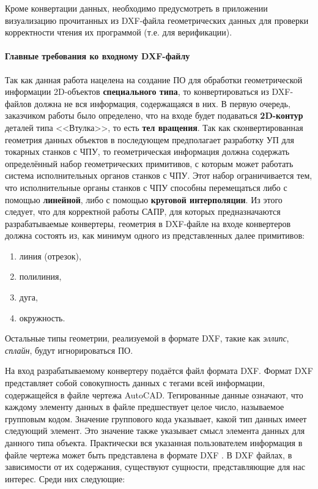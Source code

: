 Кроме конвертации данных, необходимо предусмотреть в приложении визуализацию прочитанных из DXF-файла геометрических данных для проверки корректности чтения их программой (т.е. для верификации).

\paragraph{Главные требования ко входному DXF-файлу}

Так как данная работа нацелена на создание ПО для обработки геометрической информации 2D-объектов \textbf{специального типа}, то конвертироваться из DXF-файлов должна не вся информация, содержащаяся в них. В первую очередь, заказчиком работы было определено, что на входе будет подаваться \textbf{2D-контур} деталей типа <<Втулка>>, то есть \textbf{тел вращения}. Так как сконвертированная геометрия данных объектов в последующем предполагает разработку УП для токарных станков с ЧПУ, то геометрическая информация должна содержать определённый набор геометрических примитивов, с которым может работать система исполнительных органов станков с ЧПУ. Этот набор ограничивается тем, что исполнительные органы станков с ЧПУ способны перемещаться либо с помощью \textbf{линейной}, либо с помощью \textbf{круговой интерполяции}. Из этого следует, что для корректной работы САПР, для которых предназначаются разрабатываемые конвертеры, геометрия в DXF-файле на входе конвертеров должна состоять из, как минимум одного из представленных далее примитивов:

\begin{enumerate}
	\item линия (отрезок),
	\item полилиния,
	\item дуга,
	\item окружность.
\end{enumerate}

Остальные типы геометрии, реализуемой в формате DXF, такие как \textit{эллипс}, \textit{сплайн}, будут игнорироваться ПО.

На вход разрабатываемому конвертеру подаётся файл формата DXF. Формат DXF представляет собой совокупность данных с тегами всей информации, содержащейся в файле чертежа AutoCAD. Тегированные данные означают, что каждому элементу данных в файле предшествует целое число, называемое групповым кодом. Значение группового кода указывает, какой тип данных имеет следующий элемент. Это значение также указывает смысл элемента данных для данного типа объекта. Практически вся указанная пользователем информация в файле чертежа может быть представлена в формате DXF \cite{autocad2012dxf}.
В DXF файлах, в зависимости от их содержания, существуют сущности, представляющие для нас интерес. Среди них следующие:

